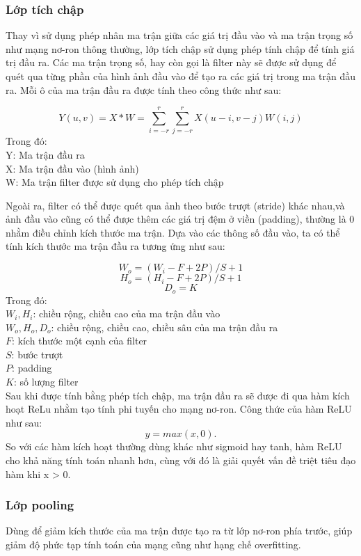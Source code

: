 \documentclass[a4paper,14pt]{extreport}
\begin{document}
\subsubsection*{Lớp tích chập}
Thay vì sử dụng phép nhân ma trận giữa các giá trị đầu vào và ma trận trọng số như mạng nơ-ron thông thường, 
lớp tích chập sử dụng phép tính chập để tính giá trị đầu ra. Các ma trận trọng số, hay còn gọi là filter 
này sẽ được sử dụng để quét qua từng phần của hình ảnh đầu vào để tạo ra các giá trị trong ma trận đầu ra.  
Mỗi ô của ma trận đầu ra được tính theo công thức như sau:

\[ Y(u,v) = X*W = \sum_{i=-r}^{r} \sum_{j=-r}^{r} X(u - i,v - j)W(i,j) \]
Trong đó: \\
Y: Ma trận đầu ra \\
X: Ma trận đầu vào (hình ảnh) \\
W: Ma trận filter được sử dụng cho phép tích chập

Ngoài ra, filter có thể được quét qua ảnh theo bước trượt (stride) khác nhau,và ảnh đầu vào cũng có thể được thêm các giá trị đệm ở viền (padding), thường là 0 nhằm điều chỉnh kích thước ma trận. Dựa vào các thông số đầu vào, ta có thể tính kích thước ma trận đầu ra tương ứng như sau:

\[ W_o = (W_i - F + 2P) / S + 1 \]
\[ H_o = (H_i - F + 2P) / S + 1 \]
\[ D_o = K \]
Trong đó: \\
$ W_i, H_i $: chiều rộng, chiều cao của ma trận đầu vào \\
$ W_o, H_o, D_o $: chiều rộng, chiều cao, chiều sâu của ma trận đầu ra \\
$ F $: kích thước một cạnh của filter \\
$ S $: bước trượt \\
$ P $: padding \\
$ K $: số lượng filter \\

Sau khi được tính bằng phép tích chập, ma trận đầu ra sẽ được đi qua hàm kích hoạt ReLu nhằm tạo 
tính phi tuyến cho mạng nơ-ron. Công thức của hàm ReLU như sau:
\[ y = max(x, 0). \]
So với các hàm kích hoạt thường dùng khác như sigmoid hay tanh, hàm ReLU cho khả năng tính toán nhanh hơn, 
cùng với đó là giải quyết vấn đề triệt tiêu đạo hàm khi x > 0.

\subsubsection*{Lớp pooling}
Dùng để giảm kích thước của ma trận được tạo ra từ lớp nơ-ron phía trước, giúp giảm độ phức tạp tính toán của mạng cũng như hạng chế overfitting.
\end{document}
